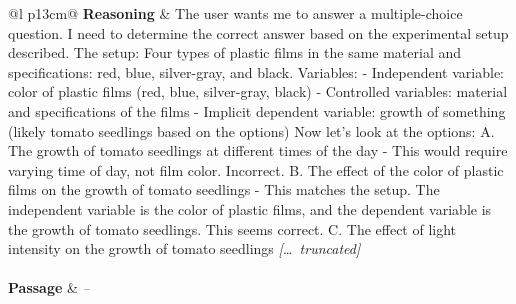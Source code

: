 \begin{longtable}{@{}l p{13cm}@{}}
  \textbf{Reasoning} & The user wants me to answer a multiple-choice question. I need to determine the correct answer based on the experimental setup described. \newline The setup: Four types of plastic films in the same material and specifications: red, blue, silver-gray, and black. \newline Variables: \newline - Independent variable: color of plastic films (red, blue, silver-gray, black) \newline - Controlled variables: material and specifications of the films \newline - Implicit dependent variable: growth of something (likely tomato seedlings based on the options) \newline Now let's look at the options: \newline A. The growth of tomato seedlings at different times of the day \newline - This would require varying time of day, not film color. Incorrect. \newline B. The effect of the color of plastic films on the growth of tomato seedlings \newline - This matches the setup. The independent variable is the color of plastic films, and the dependent variable is the growth of tomato seedlings. This seems correct. \newline C. The effect of light intensity on the growth of tomato seedlings \newline \textit{[\ldots\ truncated]}  \\
  \midrule
   \\
  \textbf{Passage}   & \textit{--}    \\

\end{longtable}
